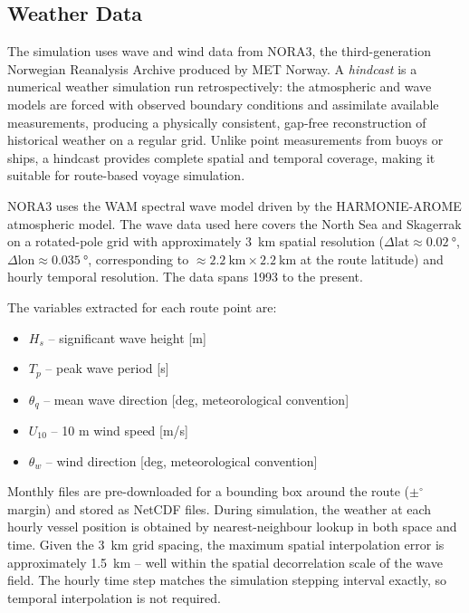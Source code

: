 \documentclass[a4paper,11pt]{article}
\begin{document}
\subsection{Weather Data}
\label{sec:orgc1595fb}

The simulation uses wave and wind data from NORA3, the third-generation
Norwegian Reanalysis Archive produced by MET Norway.  A \emph{hindcast} is a
numerical weather simulation run retrospectively: the atmospheric and wave
models are forced with observed boundary conditions and assimilate available
measurements, producing a physically consistent, gap-free reconstruction of
historical weather on a regular grid.  Unlike point measurements from buoys or
ships, a hindcast provides complete spatial and temporal coverage, making it
suitable for route-based voyage simulation.

NORA3 uses the WAM spectral wave model driven by the HARMONIE-AROME atmospheric
model.  The wave data used here covers the North Sea and Skagerrak on a rotated-pole
grid with approximately \SI{3}{\kilo\metre} spatial resolution
(\(\Delta\text{lat} \approx \SI{0.02}{\degree}\),
\(\Delta\text{lon} \approx \SI{0.035}{\degree}\), corresponding to
\(\approx \SI{2.2}{\kilo\metre} \times \SI{2.2}{\kilo\metre}\) at the route
latitude) and hourly temporal resolution.  The data spans 1993 to the present.

The variables extracted for each route point are:
\begin{itemize}
\item \(H_s\) -- significant wave height [m]
\item \(T_p\) -- peak wave period [s]
\item \(\theta_q\) -- mean wave direction [deg, meteorological convention]
\item \(U_{10}\) -- 10 m wind speed [m/s]
\item \(\theta_w\) -- wind direction [deg, meteorological convention]
\end{itemize}

Monthly files are pre-downloaded for a bounding box around the route
($\pm$$^\circ$ margin) and stored as NetCDF files.  During
simulation, the weather at each hourly vessel position is obtained by
nearest-neighbour lookup in both space and time.  Given the \SI{3}{\kilo\metre}
grid spacing, the maximum spatial interpolation error is approximately
\SI{1.5}{\kilo\metre} -- well within the spatial decorrelation scale of the wave
field.  The hourly time step matches the simulation stepping interval exactly, so
temporal interpolation is not required.
\end{document}
